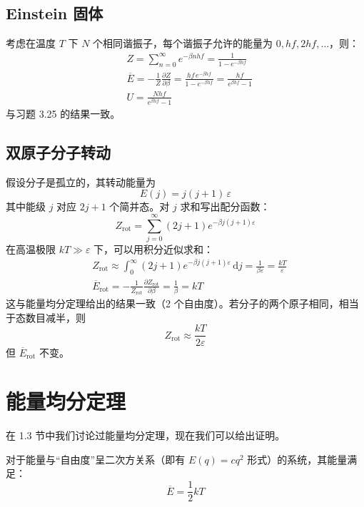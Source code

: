 \subsection{Einstein 固体}
考虑在温度 $T$ 下 $N$ 个相同谐振子，每个谐振子允许的能量为 $0,hf,2hf,\dots$，则：
\begin{align}
&Z=\sum_{n=0}^{\infty}e^{-\beta nhf}=\frac{1}{1-e^{-\beta hf}}\\
&\overline E=-\frac{1}{Z}\frac{\partial Z}{\partial \beta} =\frac{hf\,e^{-\beta hf}}{1-e^{-\beta hf}} =\frac{hf}{e^{\beta hf}-1}\\
&U=\frac{Nhf}{e^{\beta hf}-1}
\end{align}
与习题 3.25 的结果一致。

\subsection{双原子分子转动}
假设分子是孤立的，其转动能量为
\begin{equation}
    E(j)=j(j+1)\,\varepsilon
\end{equation}
其中能级 $j$ 对应 $2j+1$ 个简并态。对 $j$ 求和写出配分函数：
\begin{equation}
Z_{\mathrm{rot}}=\sum_{j=0}^{\infty}(2j+1)e^{-\beta j(j+1)\varepsilon}
\end{equation}
在高温极限 $kT\gg\varepsilon$ 下，可以用积分近似求和：
\begin{align}
&Z_{\mathrm{rot}}
\approx \int_0^{\infty}(2j+1)e^{-\beta j(j+1)\varepsilon}\,\mathrm{d}j
=\frac{1}{\beta\varepsilon}=\frac{kT}{\varepsilon}\\
&\overline E_{\mathrm{rot}}
=-\frac{1}{Z_{\mathrm{rot}}}\frac{\partial Z_{\mathrm{rot}}}{\partial \beta}
=\frac{1}{\beta}=kT
\end{align}
这与能量均分定理给出的结果一致（2 个自由度）。若分子的两个原子相同，相当于态数目减半，则
\begin{equation}
Z_{\mathrm{rot}}\approx \frac{kT}{2\varepsilon}
\end{equation}
但 $\overline E_{\mathrm{rot}}$ 不变。

\section{能量均分定理}
在 1.3 节中我们讨论过能量均分定理，现在我们可以给出证明。
\begin{theorem}[能量均分定理]
    对于能量与``自由度''呈二次方关系（即有 $E(q) = cq^2$ 形式）的系统，其能量满足：
    \begin{equation}
        \overline{E} = \frac{1}{2}kT
    \end{equation}
\end{theorem}

